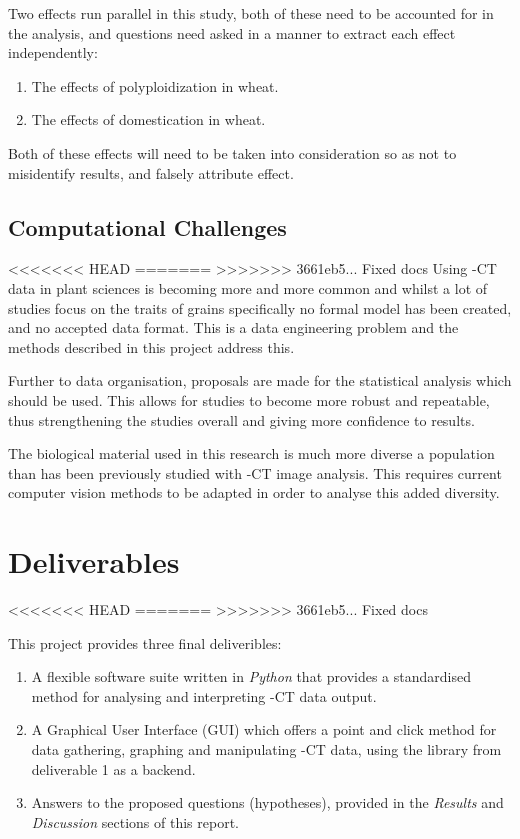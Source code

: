 \documentclass[11pt]{report}
\begin{document}
Two effects run parallel in this study, both of these need to be accounted for in the analysis, and questions need asked in a manner to extract each effect independently:

\begin{enumerate}
\item The effects of polyploidization in wheat.
\item The effects of domestication in wheat.
\end{enumerate}

Both of these effects will need to be taken into consideration so as not to misidentify results, and falsely attribute effect.

\subsection{Computational Challenges}
<<<<<<< HEAD
\label{sec:orge186db1}
=======
\label{sec:org42a8798}
>>>>>>> 3661eb5... Fixed docs
Using \textmu{}-CT data in plant sciences is becoming more and more common \cite{Tracy2017,Jhala2015,Hughes2017,Metzner2015} and whilst a lot of studies focus on the traits of grains specifically no formal model has been created, and no accepted data format. This is a data engineering problem and the methods described in this project address this.

Further to data organisation, proposals are made for the statistical analysis which should be used. This allows for studies to become more robust and repeatable, thus strengthening the studies overall and giving more confidence to results.

The biological material used in this research is much more diverse a population than has been previously studied with \textmu{}-CT image analysis. This requires current computer vision methods to be adapted in order to analyse this added diversity.

\section{Deliverables}
<<<<<<< HEAD
\label{sec:org3b551c1}
=======
\label{sec:org8c0dc13}
>>>>>>> 3661eb5... Fixed docs

This project provides three final deliveribles:

\begin{enumerate}
\item A flexible software suite written in \emph{Python} that provides a standardised method for analysing and interpreting \textmu{}-CT data output.
\item A Graphical User Interface (GUI) which offers a point and click method for data gathering, graphing and manipulating \textmu{}-CT data, using the library from deliverable 1 as a backend.
\item Answers to the proposed questions (hypotheses), provided in the \emph{Results} and \emph{Discussion} sections of this report.
\end{enumerate}
\end{document}

